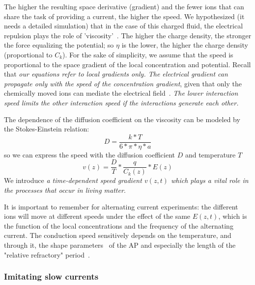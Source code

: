 The higher the resulting space derivative (gradient) and the fewer ions that
can share the task of providing a current, the higher the speed. We hypothesized (it needs
a detailed simulation) that in the case of this charged fluid, the
electrical repulsion plays the role of 'viscosity'~\cite{VeghNonOrdinaryLawsForLife:2025}. The higher the charge
density, the stronger the force equalizing the potential; so $\eta$
is the lower, the higher the charge density (proportional to $C_{k}$).
For the sake of simplicity, we assume that the speed is proportional
to the space gradient of the local concentration and potential. Recall that \emph{our equations
	refer to local gradients only. The electrical gradient can propagate
	only with the speed of the concentration gradient}, given that only
the chemically moved ions can mediate the electrical field~\cite{VeghNonOrdinaryLawsForLife:2025}. \emph{The
	lower interaction speed limits the other interaction speed if the
	interactions generate each other.}
\else

\fi

\ifx\magyar\undefined

The dependence of the diffusion coefficient on the viscosity can be modeled by the Stokes-Einstein relation:
\begin{equation}
	\label{eq:StokesEinstein}
	D = \frac{k*T}{6*\pi*\eta*a}
\end{equation}
so we can express the speed with the diffusion coefficient $D$ and temperature $T$
\begin{equation}
	v(z) = \frac{D}{T}*\frac{q}{C_k(z)}*E(z)\label{eq:StokesEinsteinSpeeddV}
\end{equation}
We introduce \textit{a time-dependent speed gradient
	$v(z,t)$
	which plays a vital role in the processes that occur in living matter}.


It is important to remember for alternating current experiments: 
the different ions will move at different speeds
under the effect of the same $E(z,t)$, which is the function of
the local concentrations and the frequency of the alternating current.
The conduction speed sensitively depends 
on the temperature, and through it, the shape parameters~\cite{APTemperatureDependence:2012} of the \gls{AP} and especially the length of the "relative refractory" period~\cite{APTemperatureDependenceRefractory:2001}.

\else

\fi

\ifx\magyar\undefined
\subsubsection{Imitating slow currents\label{sec:SlowCurrent}}
\else

